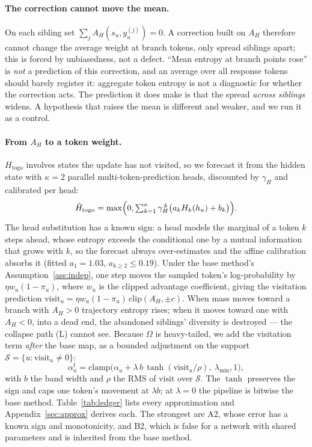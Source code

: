 \documentclass[11pt]{article}
\newcommand{\Htogo}{H_{\mathrm{togo}}}
\newcommand{\AH}{A_{H}}
\newcommand{\Om}{\Omega}
\begin{document}
\paragraph{The correction cannot move the mean.}
\label{sec:zerosum}
On each sibling set $\sum_j \AH(s_u, y^{(j)}_u) = 0$. A correction built on $\AH$
therefore cannot change the average weight at branch tokens, only spread siblings
apart; this is forced by unbiasedness, not a defect. ``Mean entropy at branch points
rose'' is \emph{not} a prediction of this correction, and an average over all response
tokens should barely register it: aggregate token entropy is not a diagnostic for
whether the correction acts. The prediction it does make is that the spread
\emph{across siblings} widens. A hypothesis that raises the mean is different and
weaker, and we run it as a control.

\paragraph{From $\AH$ to a token weight.} $\Htogo$ involves states the update has not
visited, so we forecast it from the hidden state with $\kappa = 2$ parallel
multi-token-prediction heads, discounted by $\gamma_H$ and calibrated per head:
\begin{equation}
\hat{H}_{\mathrm{togo}} = \max\Bigl(0, \textstyle\sum_{k=1}^{\kappa} \gamma_H^{\,k}\bigl(a_k H_k(h_u) + b_k\bigr)\Bigr).
\label{eq:forecast}
\end{equation}
The head substitution has a known sign: a head models the marginal of a token $k$
steps ahead, whose entropy exceeds the conditional one by a mutual information that
grows with $k$, so the forecast always over-estimates and the affine calibration
absorbs it (fitted $a_1 = 1.03$, $a_{k\ge2} \le 0.19$). Under the base method's
Assumption~\ref{ass:indep}, one step moves the sampled token's log-probability by
$\eta w_u (1 - \pi_u)$, where $w_u$ is the clipped advantage coefficient, giving the
visitation prediction $\mathrm{visit}_u = \eta w_u (1-\pi_u)\,\mathrm{clip}(\AH,
\pm c)$. When mass moves toward a branch with $\AH > 0$ trajectory entropy rises; when
it moves toward one with $\AH < 0$, into a dead end, the abandoned siblings' diversity
is destroyed --- the collapse path (L) cannot see. Because $\Om$ is heavy-tailed, we
add the visitation term \emph{after} the base map, as a bounded adjustment on the
support $\mathcal{S} = \{u : \mathrm{visit}_u \ne 0\}$:
\begin{equation}
\alpha^{\mathrm{f}}_u = \mathrm{clamp}\bigl(\alpha_u
  + \lambda\, b\, \tanh(\mathrm{visit}_u / \rho),\ \lambda_{\min}, 1\bigr),
\label{eq:combine}
\end{equation}
with $b$ the band width and $\rho$ the RMS of $\mathrm{visit}$ over $\mathcal{S}$. The
$\tanh$ preserves the sign and caps one token's movement at $\lambda b$; at
$\lambda = 0$ the pipeline is bitwise the base method. Table~\ref{tab:ledger} lists
every approximation and Appendix~\ref{sec:approx} derives each. The strongest are A2,
whose error has a known sign and monotonicity, and B2, which is false for a network
with shared parameters and is inherited from the base method.
\end{document}
